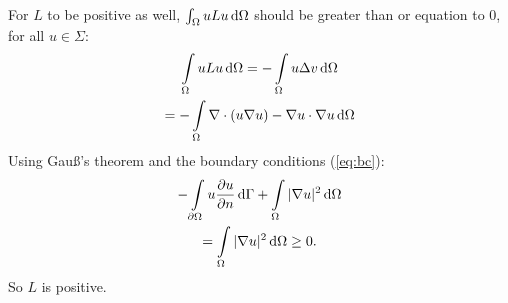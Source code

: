 For $L$ to be positive as well, $\int\displaylimits_\Omega uLu \,\mathrm{d}\Omega$ should be greater than or equation to 0, for all $u\in \Sigma$:
\begin{gather*}
    \int\displaylimits_\Omega uLu \,\mathrm{d}\Omega = - \int\displaylimits_\Omega u\Delta v \,\mathrm{d}\Omega\\
    = -\int\displaylimits_\Omega \nabla \cdot(u\nabla u) - \nabla u\cdot\nabla u \,\mathrm{d}\Omega
\end{gather*} Using Gau\ss's theorem and the boundary conditions (\ref{eq:bc}):
\begin{gather*}
    -\int\displaylimits_{\partial\Omega} u\frac{\partial u}{\partial n} \,\mathrm{d}\Gamma + \int\displaylimits_{\Omega} |\nabla u|^2 \,\mathrm{d}\Omega \\
    =\int\displaylimits_\Omega |\nabla u|^2 \,\mathrm{d}\Omega \geq 0.
\end{gather*} So $L$ is positive.


